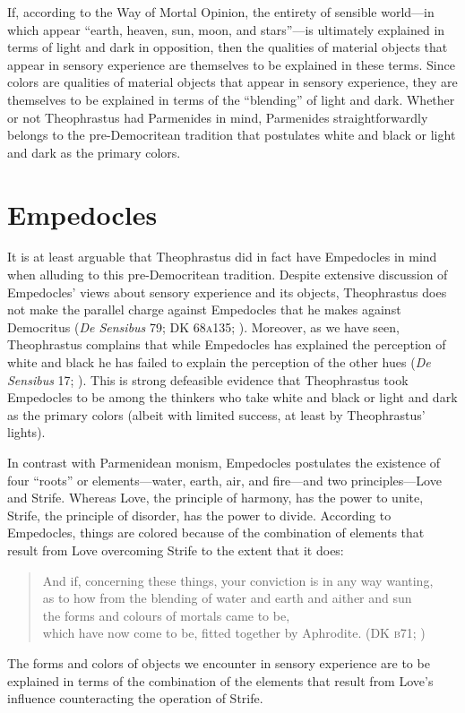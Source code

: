 If, according to the Way of Mortal Opinion, the entirety of sensible world---in which appear ``earth, heaven, sun, moon, and stars''---is ultimately explained in terms of light and dark in opposition, then the qualities of material objects that appear in sensory experience are themselves to be explained in these terms. Since colors are qualities of material objects that appear in sensory experience, they are themselves to be explained in terms of the ``blending'' of light and dark. Whether or not Theophrastus had Parmenides in mind, Parmenides straightforwardly belongs to the pre-Democritean tradition that postulates white and black or light and dark as the primary colors.


\section{Empedocles} %
\label{sec:empedocles}

It is at least arguable that Theophrastus did in fact have Empedocles in mind when alluding to this pre-Democritean tradition. Despite extensive discussion of Empedocles' views about sensory experience and its objects, Theophrastus does not make the parallel charge against Empedocles that he makes against Democritus (\emph{De Sensibus} 79; DK 68\textsc{a}135; \citealt{Stratton:1917vn}). Moreover, as we have seen, Theophrastus complains that while Empedocles has explained the perception of white and black he has failed to explain the perception of the other hues (\emph{De Sensibus} 17; \citealt{Stratton:1917vn}). This is strong defeasible evidence that Theophrastus took Empedocles to be among the thinkers who take white and black or light and dark as the primary colors (albeit with limited success, at least by Theophrastus' lights).

In contrast with Parmenidean monism, Empedocles postulates the existence of four ``roots'' or elements---water, earth, air, and fire---and two principles---\-Love and Strife. Whereas Love, the principle of harmony, has the power to unite, Strife, the principle of disorder, has the power to divide. According to Empedocles, things are colored because of the combination of elements that result from Love overcoming Strife to the extent that it does:
\begin{verse}
    And if, concerning these things, your conviction is in any way wanting,\\
    as to how from the blending of water and earth and aither and sun\\
    the forms and colours of mortals came to be,\\
    which have now come to be, fitted together by Aphrodite.
    (DK \textsc{b}71; \citealt[74 249]{Inwood:2001ve})
\end{verse}
The forms and colors of objects we encounter in sensory experience are to be explained in terms of the combination of the elements that result from Love's influence counteracting the operation of Strife.

